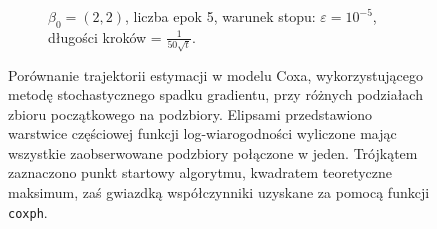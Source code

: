 \begin{figure}[hbt!]
\begin{center}
\begin{subfigure}[h!]{0.9\textwidth}
            \caption{$\beta_0=(2,2)$, liczba epok 5, warunek stopu: $\varepsilon=10^{-5}$, długości kroków = $\frac{1}{50\sqrt{t}}$.}
   \end{subfigure}  
      \end{center}
  \caption[Porównanie estymacji w modelu Coxa metodą stochastycznego spadku gradientu dla różnych podziałów zbioru początkowego na podzbiory.]{\label{rysCox2}Porównanie trajektorii estymacji w modelu Coxa, wykorzystującego metodę stochastycznego spadku gradientu, przy różnych podziałach zbioru początkowego na podzbiory. Elipsami przedstawiono warstwice częściowej funkcji log-wiarogodności wyliczone mając wszystkie zaobserwowane podzbiory połączone w jeden. Trójkątem zaznaczono punkt startowy algorytmu, kwadratem teoretyczne maksimum, zaś gwiazdką współczynniki uzyskane za pomocą funkcji \texttt{coxph}.}
\end{figure}
	
	
	
